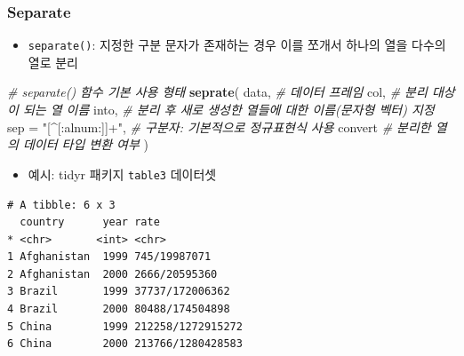 \documentclass[
  11pt,
]{krantz}
\newenvironment{Shaded}{\begin{snugshade}}{\end{snugshade}}
\newcommand{\CommentTok}[1]{\textcolor[rgb]{0.37,0.37,0.37}{\textit{#1}}}
\newcommand{\DataTypeTok}[1]{\textcolor[rgb]{0.27,0.27,0.27}{#1}}
\newcommand{\KeywordTok}[1]{\textcolor[rgb]{0.27,0.27,0.27}{\textbf{#1}}}
\newcommand{\NormalTok}[1]{#1}
\newcommand{\OperatorTok}[1]{\textcolor[rgb]{0.43,0.43,0.43}{\textbf{#1}}}
\newcommand{\StringTok}[1]{\textcolor[rgb]{0.5,0.5,0.5}{#1}}
\providecommand{\tightlist}{%
  \setlength{\itemsep}{0pt}\setlength{\parskip}{0pt}}
\begin{document}
\hypertarget{saparate}{%
\subsubsection*{Separate}\label{saparate}}


\begin{itemize}
\tightlist
\item
  \texttt{separate()}: 지정한 구분 문자가 존재하는 경우 이를 쪼개서 하나의 열을 다수의 열로 분리
\end{itemize}

\footnotesize

\begin{Shaded}
\begin{Highlighting}[]
\CommentTok{# separate() 함수 기본 사용 형태}
\KeywordTok{seprate}\NormalTok{(}
\NormalTok{  data, }\CommentTok{# 데이터 프레임}
\NormalTok{  col, }\CommentTok{# 분리 대상이 되는 열 이름}
\NormalTok{  into, }\CommentTok{# 분리 후 새로 생성한 열들에 대한 이름(문자형 벡터) 지정}
  \DataTypeTok{sep =} \StringTok{"[^[:alnum:]]+"}\NormalTok{, }\CommentTok{# 구분자: 기본적으로 정규표현식 사용}
\NormalTok{  convert }\CommentTok{# 분리한 열의 데이터 타입 변환 여부}
\NormalTok{)}
\end{Highlighting}
\end{Shaded}

\normalsize

\begin{itemize}
\tightlist
\item
  예시: tidyr 패키지 \texttt{table3} 데이터셋
\end{itemize}

\footnotesize

\begin{Shaded}
\end{Shaded}

\begin{verbatim}
# A tibble: 6 x 3
  country      year rate             
* <chr>       <int> <chr>            
1 Afghanistan  1999 745/19987071     
2 Afghanistan  2000 2666/20595360    
3 Brazil       1999 37737/172006362  
4 Brazil       2000 80488/174504898  
5 China        1999 212258/1272915272
6 China        2000 213766/1280428583
\end{verbatim}

\begin{Shaded}
\end{Shaded}
\end{document}
